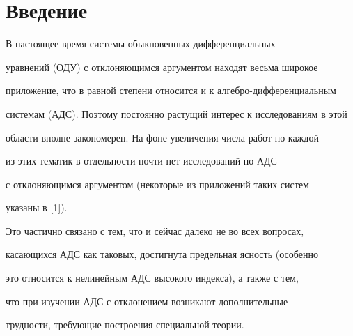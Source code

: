 \date{}




\pagestyle{plain} %







\maketitle


\label{begin}











\section{Введение}





В настоящее время системы обыкновенных дифференциальных


уравнений (ОДУ) с отклоняющимся аргументом находят весьма широкое


приложение, что в равной степени относится и к алгебро-дифференциальным


системам (АДС). Поэтому постоянно растущий интерес к исследованиям в этой


области вполне закономерен. На фоне увеличения числа работ по каждой


из этих тематик в отдельности почти нет исследований по АДС 


с отклоняющимся аргументом (некоторые из приложений таких систем


указаны в [1]).


Это частично связано с тем, что и сейчас далеко не во всех вопросах,


касающихся АДС как таковых, достигнута предельная ясность (особенно


это относится к нелинейным АДС высокого индекса), а также с тем, 


что при изучении  АДС с отклонением возникают дополнительные 


трудности, требующие построения специальной теории.





